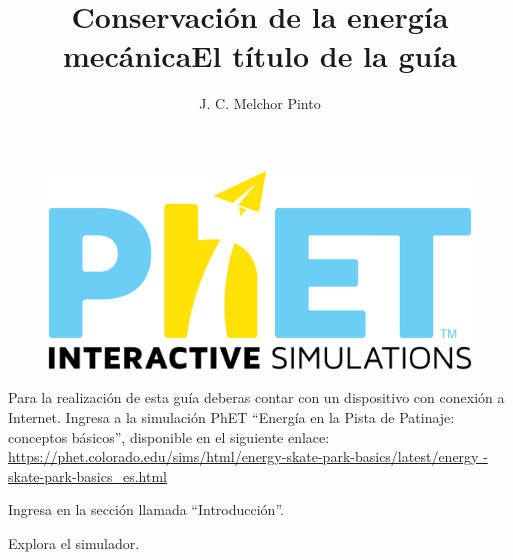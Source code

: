 \documentclass[12pt,addpoints,answers]{guia}
\title{Conservación de la energía mecánica}
\title{El título de la guía}
\author{J. C. Melchor Pinto}
\begin{document}
\pagestyle{headandfoot}

\INFO
\begin{opening}
    {
    \vspace{-0.7cm}
    \begin{figure}[H]
        \centering
        \includegraphics[width=.12\linewidth]{../images/phet}
    \end{figure}
    Para la realización de esta guía deberas contar con un dispositivo con
    conexión a Internet. Ingresa a la simulación PhET ``Energía en la Pista de
    Patinaje: conceptos básicos'', disponible en el siguiente enlace: \\
    {
    \small
    \url{https://phet.colorado.edu/sims/html/energy-skate-park-basics/latest/energy
        -skate-park-basics_es.html}
    }\\
    \begin{center}
        \begin{minipage}{0.8\textwidth}
            \begin{minipage}{.1\linewidth}
                \color{colorrds}\huge\faHome
            \end{minipage}%
            \begin{minipage}{.90\linewidth}
                \begin{tcolorbox}[width=\linewidth ,halign=left,colframe=rdsdark,arc=3mm, sharp corners=west]
                    Ingresa en la sección llamada ``Introducción''.\\
                \end{tcolorbox}
            \end{minipage}
        \end{minipage}

        \begin{minipage}{0.8\textwidth}
            \begin{minipage}{.1\linewidth}
                \color{colorrds}\huge\faSearch
            \end{minipage}%
            \begin{minipage}{.9\linewidth}
                \begin{tcolorbox}[width=\linewidth,halign=left,colframe=rdsdark,arc=3mm, sharp corners=west]
                    Explora el simulador.\\
                \end{tcolorbox}
            \end{minipage}
        \end{minipage}


\end{center}}
\end{opening}
\end{document}
